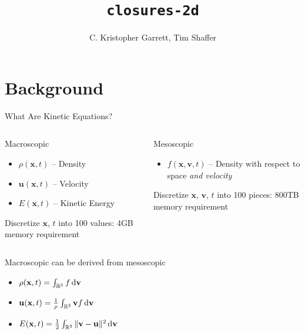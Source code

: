 \documentclass{beamer}
\title{\texttt{closures-2d}}
\author{C. Kristopher Garrett, Tim Shaffer}
\renewcommand{\vec}[1]{\ensuremath{\mathbf{#1}}}
\newcommand{\R}{\ensuremath{\mathbb{R}}\xspace}
\begin{document}
    \frame{\titlepage}

\section{Background}

    \begin{frame}{What Are Kinetic Equations?}
        \begin{columns}[t]
            \begin{block}{Macroscopic}
                \begin{itemize}
                    \item $\rho(\vec{x},t)$ -- Density
                    \item $\vec{u}(\vec{x},t)$ -- Velocity
                    \item $E(\vec{x},t)$ -- Kinetic Energy
                \end{itemize}
                Discretize \vec{x}, $t$ into 100 values: 4GB memory requirement
            \end{block}
            \begin{block}{Mesoscopic}
                \begin{itemize}
                    \item $f(\vec{x},\vec{v},t)$ -- Density with respect to space \emph{and velocity}
                \end{itemize}
                Discretize \vec{x}, \vec{v}, $t$ into 100 pieces: 800TB memory requirement
            \end{block}
        \end{columns}

        \vfill

        Macroscopic can be derived from mesoscopic
        \begin{itemize}
            \item $\rho(\vec{x},t) = \int_{\R^3} f \dif \vec{v}$
            \item $\vec{u}(\vec{x},t) = \frac{1}{\rho} \int_{\R^3} \vec{v}f \dif \vec{v}$
            \item $E(\vec{x},t) = \frac{1}{2} \int_{\R^3} \| \vec{v} - \vec{u} \|^2 \dif \vec{v}$
        \end{itemize}
    \end{frame}
\end{document}
